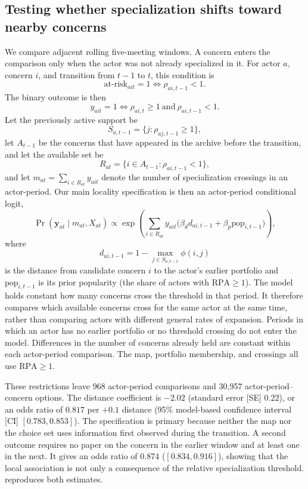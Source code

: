 \documentclass{fun_article}
\begin{document}
\subsection{Testing whether specialization shifts toward nearby concerns}\label{sec:hazard-model}
We compare adjacent rolling five-meeting windows. A concern enters the comparison only when the actor was not already specialized in it. For actor $a$, concern $i$, and transition from $t-1$ to $t$, this condition is
\[
\text{at-risk}_{a i t}=1 \iff \rho_{a i, t-1} < 1.
\]
The binary outcome is then
\[
y_{a i t}=1 \iff \rho_{a i, t} \ge 1 \ \text{and}\ \rho_{a i, t-1} < 1.
\]
Let the previously active support be
\[
S_{a,t-1}=\{j:\rho_{aj,t-1}\ge 1\},
\]
let $A_{t-1}$ be the concerns that have appeared in the archive before the transition, and let the available set be
\[
R_{at}=\{i\in A_{t-1}:\rho_{ai,t-1}<1\},
\]
and let $m_{at}=\sum_{i\in R_{at}} y_{ait}$ denote the number of specialization crossings in an actor-period. Our main locality specification is then an actor-period conditional logit,
\begin{dmath}
\Pr(\mathbf{y}_{at}\mid m_{at}, X_{at})
\propto
\exp\!\left(\sum_{i\in R_{at}}y_{ait}\bigl(\beta_d d_{a i, t-1}\!+\! \beta_p \mathrm{pop}_{i,t-1}
\bigr)
\right),
\end{dmath}
where
\[
d_{a i, t-1}=1-\max_{j\in S_{a,t-1}}\phi(i,j)
\]
is the distance from candidate concern $i$ to the actor's earlier portfolio and $\mathrm{pop}_{i,t-1}$ is its prior popularity (the share of actors with $\mathrm{RPA} \ge 1$). The model holds constant how many concerns cross the threshold in that period. It therefore compares which available concerns cross for the same actor at the same time, rather than comparing actors with different general rates of expansion. Periods in which an actor has no earlier portfolio or no threshold crossing do not enter the model. Differences in the number of concerns already held are constant within each actor-period comparison. The map, portfolio membership, and crossings all use $\mathrm{RPA}\ge1$.

These restrictions leave 968 actor-period comparisons and 30,957 actor-period--concern options. The distance coefficient is $-2.02$ (standard error [SE] $0.22$), or an odds ratio of $0.817$ per $+0.1$ distance (95\% model-based confidence interval [CI] $[0.783,0.853]$). The specification is primary because neither the map nor the choice set uses information first observed during the transition. A second outcome requires no paper on the concern in the earlier window and at least one in the next. It gives an odds ratio of $0.874$ ($[0.834,0.916]$), showing that the local association is not only a consequence of the relative specialization threshold. \texttt{} reproduces both estimates.
\end{document}
